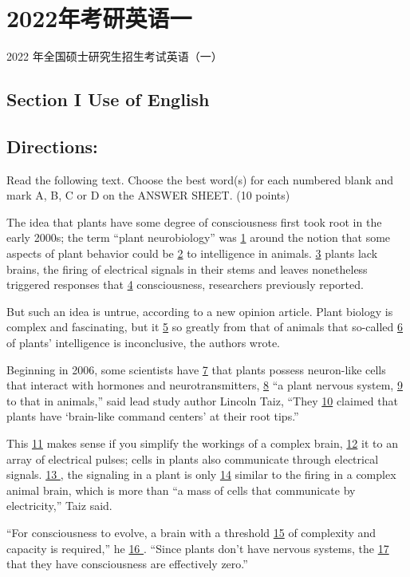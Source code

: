 \documentclass[UTF8,11pt]{ctexart}
\begin{document}
\section*{2022年考研英语一}
2022 年全国硕士研究生招生考试英语（一）


\subsection*{\textbf{Section I Use of English}}


\subsection*{\textbf{Directions:}}


Read the following text. Choose the best word(s) for each numbered blank and mark A, B, C or D on the ANSWER SHEET. (10 points)


The idea that plants have some degree of consciousness first took root in the early 2000s; the term “plant neurobiology” was \uline{1} around the notion that some aspects of plant behavior could be \uline{2} to intelligence in animals. \uline{3} plants lack brains, the firing of electrical signals in their stems and leaves nonetheless triggered responses that \uline{4} consciousness, researchers previously reported.


But such an idea is untrue, according to a new opinion article. Plant biology is complex and fascinating, but it \uline{5} so greatly from that of animals that so-called \uline{6} of plants’ intelligence is inconclusive, the authors wrote.


Beginning in 2006, some scientists have \uline{7} that plants possess neuron-like cells that interact with hormones and neurotransmitters, \uline{8} “a plant nervous system, \uline{9} to that in animals,” said lead study author Lincoln Taiz, “They \uline{10} claimed that plants have ‘brain-like command centers’ at their root tips.”


This \uline{11} makes sense if you simplify the workings of a complex brain, \uline{12} it to an array of electrical pulses; cells in plants also communicate through electrical signals. \uline{13 }, the signaling in a plant is only \uline{14} similar to the firing in a complex animal brain, which is more than “a mass of cells that communicate by electricity,” Taiz said.


“For consciousness to evolve, a brain with a threshold \uline{15} of complexity and capacity is required,” he \uline{16 }. “Since plants don’t have nervous systems, the \uline{17} that they have consciousness are effectively zero.”
\end{document}
